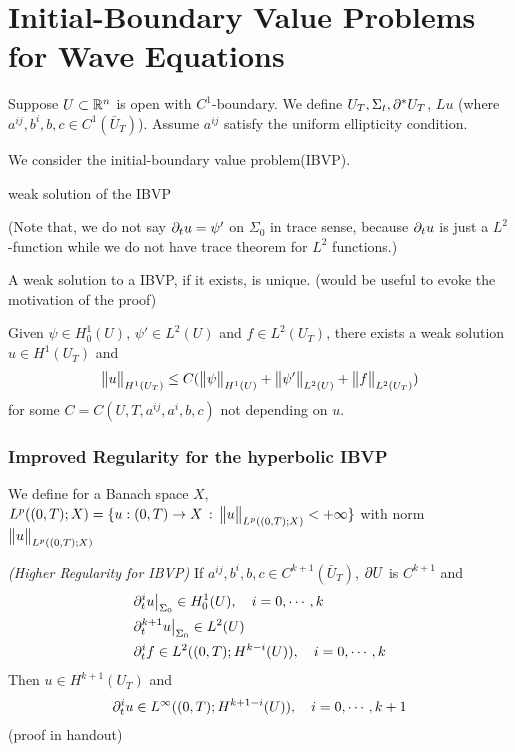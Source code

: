 \documentclass[10pt,a4paper]{report}
\begin{document}
\section*{Initial-Boundary Value Problems for Wave Equations}

Suppose $U\subset \mathbb{R}^n$ is open with $C^1$-boundary. We define $U_T, \Sigma_t, \partial^* U_T$, $Lu$ (where $a^{ij}, b^i, b,c \in C^1(\bar{U}_T)$). Assume $a^{ij}$ satisfy the uniform ellipticity condition.

\quad We consider the initial-boundary value problem(IBVP).
\s

 weak solution of the IBVP 

(Note that, we do not say $\partial_t u = \psi'$ on $\Sigma_0$ in trace sense, because $\partial_t u$ is just a $L^2$-function while we do not have trace theorem for $L^2$ functions.)
\s

\thm A weak solution to a IBVP, if it exists, is unique. (would be useful to evoke the motivation of the proof)
\s

\thm Given $\psi \in H_0^1(U)$, $\psi' \in L^2(U)$ and $f\in L^2(U_T)$, there exists a weak solution $u\in H^1(U_T)$ and
\begin{align}
\bigl\lVert u\bigr\rVert_{H^1(U_T)} \leq C(\bigl\lVert\psi\bigr\rVert_{H^1(U)} +\bigl\lVert\psi'\bigr\rVert_{L^2(U)} + \bigl\lVert f\bigr\rVert_{L^2(U_T)}) \label{33}
\end{align}
for some $C = C(U,T,a^{ij},a^i,b,c)$ not depending on $u$.
\s

\subsubsection*{Improved Regularity for the hyperbolic IBVP}

We define for a Banach space $X$, $L^p((0,T); X) = \{ u : (0,T) \rightarrow X \,:\, \bigl\lVert u\bigr\rVert_{L^p((0,T);X)} < +\infty \}$ with norm $\bigl\lVert u\bigr\rVert_{L^p((0,T);X)}$
\s

\thm \emph{(Higher Regularity for IBVP)} If $a^{ij}, b^i, b, c\in C^{k+1}(\bar{U}_T)$, $\partial U$ is $C^{k+1}$ and 
\begin{align*}
& \partial^i_t u \big|_{\Sigma_0} \in H_0^1(U), \quad i=0, \cdots,k \\
& \partial_t^{k+1} u \big|_{\Sigma_0} \in L^2(U) \\
& \partial_t^i f \in L^2((0,T) ; H^{k-i}(U)), \quad i=0, \cdots, k
\end{align*}
Then $u\in H^{k+1}(U_T)$ and
\begin{align*}
\partial_t^i u \in L^{\infty}((0,T) ; H^{k+1-i}(U)), \quad i=0, \cdots, k+1
\end{align*}
(proof in handout)
\s
\end{document}
